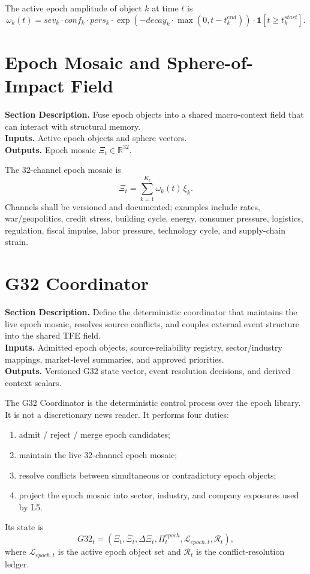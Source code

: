 \documentclass[11pt]{report}
\newcommand{\meta}[3]{\textbf{Section Description.} #1\\
\textbf{Inputs.} #2\\
\textbf{Outputs.} #3\par}
\begin{document}
The active epoch amplitude of object $k$ at time $t$ is
\[
\omega_k(t)=sev_k\cdot conf_k\cdot pers_k\cdot \exp(-decay_k\cdot \max(0,t-t_k^{end}))\cdot \mathbf{1}[t\ge t_k^{start}].
\]

\section{Epoch Mosaic and Sphere-of-Impact Field}
\meta{Fuse epoch objects into a shared macro-context field that can interact with structural memory.}{Active epoch objects and sphere vectors.}{Epoch mosaic $\Xi_t \in \mathbb{R}^{32}$.}

The 32-channel epoch mosaic is
\[
\Xi_t = \sum_{k=1}^{K_t} \omega_k(t)\,\xi_k.
\]
Channels shall be versioned and documented; examples include rates, war/geopolitics, credit stress, building cycle, energy, consumer pressure, logistics, regulation, fiscal impulse, labor pressure, technology cycle, and supply-chain strain.

\section{G32 Coordinator}
\meta{Define the deterministic coordinator that maintains the live epoch mosaic, resolves source conflicts, and couples external event structure into the shared TFE field.}{Admitted epoch objects, source-reliability registry, sector/industry mappings, market-level summaries, and approved priorities.}{Versioned G32 state vector, event resolution decisions, and derived context scalars.}

The G32 Coordinator is the deterministic control process over the epoch library. It is not a discretionary news reader. It performs four duties:
\begin{enumerate}[leftmargin=1.2cm]
    \item admit / reject / merge epoch candidates;
    \item maintain the live 32-channel epoch mosaic;
    \item resolve conflicts between simultaneous or contradictory epoch objects;
    \item project the epoch mosaic into sector, industry, and company exposures used by L5.
\end{enumerate}

Its state is
\[
G32_t=(\Xi_t,\bar\Xi_t,\Delta\Xi_t,\Pi_t^{epoch},\mathcal{L}_{epoch,t},\mathcal{R}_t),
\]
where $\mathcal{L}_{epoch,t}$ is the active epoch object set and $\mathcal{R}_t$ is the conflict-resolution ledger.
\end{document}
